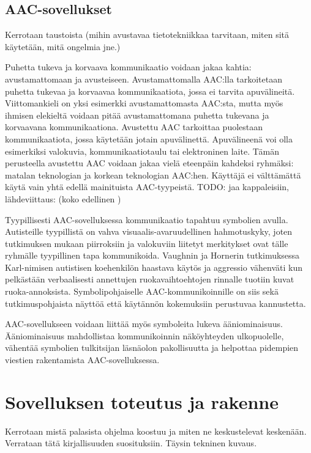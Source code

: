 \documentclass[utf8]{gradu3}
\begin{document}
\section{AAC-sovellukset}

Kerrotaan taustoista (mihin avustavaa tietotekniikkaa tarvitaan, miten sitä käytetään, mitä ongelmia jne.)

Puhetta tukeva ja korvaava kommunikaatio voidaan jakaa kahtia: avustamattomaan ja avusteiseen. Avustamattomalla AAC:lla tarkoitetaan puhetta tukevaa ja korvaavaa kommunikaatiota, jossa ei tarvita apuvälineitä. Viittomankieli on yksi esimerkki avustamattomasta AAC:sta, mutta myös ihmisen elekieltä voidaan pitää avustamattomana puhetta tukevana ja korvaavana kommunikaationa. Avustettu AAC tarkoittaa puolestaan kommunikaatiota, jossa käytetään jotain apuvälinettä. Apuvälineenä voi olla esimerkiksi valokuvia, kommunikaatiotaulu tai elektroninen laite. Tämän perusteella avustettu AAC voidaan jakaa vielä eteenpäin kahdeksi ryhmäksi: matalan teknologian ja korkean teknologian AAC:hen. Käyttäjä ei välttämättä käytä vain yhtä edellä mainituista AAC-tyypeistä.  TODO: jaa kappaleisiin, lähdeviittaus: (koko edellinen \parencite[]{AAC-conditional-use})

Tyypillisesti AAC-sovelluksessa kommunikaatio tapahtuu symbolien avulla. Autisteille tyypillistä on vahva visuaalis-avaruudellinen hahmotuskyky, joten tutkimuksen mukaan piirroksiin ja valokuviin liitetyt merkitykset ovat tälle ryhmälle tyypillinen tapa kommunikoida. Vaughnin ja Hornerin tutkimuksessa  \parencite[]{concrete-versus-verbal} Karl-nimisen autistisen koehenkilön haastava käytös ja aggressio vähenväti kun pelkästään verbaalisesti annettujen ruokavaihtoehtojen rinnalle tuotiin kuvat ruoka-annoksista. Symbolipohjaiselle AAC-kommunikoinnille on siis sekä tutkimuspohjaista näyttöä että käytännön kokemuksiin perustuvaa kannustetta.

AAC-sovellukseen voidaan liittää myös symboleita lukeva ääniominaisuus. Ääniominaisuus mahdollistaa kommunikoinnin näköyhteyden ulkopuolelle, vähentää symbolien tulkitsijan läsnäolon pakollisuutta ja helpottaa pidempien viestien rakentamista AAC-sovelluksessa.\parencite[]{AAC-interventions}

\chapter{Sovelluksen toteutus ja rakenne}

Kerrotaan mistä palasista ohjelma koostuu ja miten ne keskustelevat keskenään. Verrataan tätä kirjallisuuden suosituksiin.
Täysin tekninen kuvaus.
\end{document}
